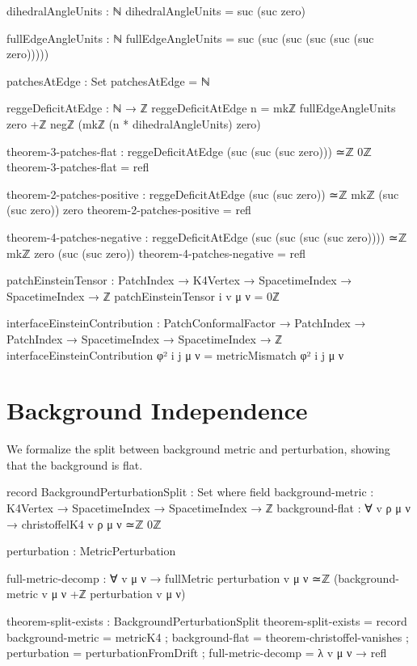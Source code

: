\documentclass[11pt,a4paper]{book}
\begin{document}
\begin{code}
dihedralAngleUnits : ℕ
dihedralAngleUnits = suc (suc zero)

fullEdgeAngleUnits : ℕ
fullEdgeAngleUnits = suc (suc (suc (suc (suc (suc zero)))))

patchesAtEdge : Set
patchesAtEdge = ℕ

reggeDeficitAtEdge : ℕ → ℤ
reggeDeficitAtEdge n = 
  mkℤ fullEdgeAngleUnits zero +ℤ 
  negℤ (mkℤ (n * dihedralAngleUnits) zero)

theorem-3-patches-flat : reggeDeficitAtEdge (suc (suc (suc zero))) ≃ℤ 0ℤ
theorem-3-patches-flat = refl

theorem-2-patches-positive : reggeDeficitAtEdge (suc (suc zero)) ≃ℤ mkℤ (suc (suc zero)) zero
theorem-2-patches-positive = refl

theorem-4-patches-negative : reggeDeficitAtEdge (suc (suc (suc (suc zero)))) ≃ℤ mkℤ zero (suc (suc zero))
theorem-4-patches-negative = refl

patchEinsteinTensor : PatchIndex → K4Vertex → SpacetimeIndex → SpacetimeIndex → ℤ
patchEinsteinTensor i v μ ν = 0ℤ

interfaceEinsteinContribution : PatchConformalFactor → PatchIndex → PatchIndex → 
                                 SpacetimeIndex → SpacetimeIndex → ℤ
interfaceEinsteinContribution φ² i j μ ν = 
  metricMismatch φ² i j μ ν
\end{code}

\section{Background Independence}

We formalize the split between background metric and perturbation, showing that the background is flat.

\begin{code}
record BackgroundPerturbationSplit : Set where
  field
    background-metric  : K4Vertex → SpacetimeIndex → SpacetimeIndex → ℤ
    background-flat    : ∀ v ρ μ ν → christoffelK4 v ρ μ ν ≃ℤ 0ℤ
    
    perturbation       : MetricPerturbation
    
    full-metric-decomp : ∀ v μ ν → 
      fullMetric perturbation v μ ν ≃ℤ (background-metric v μ ν +ℤ perturbation v μ ν)

theorem-split-exists : BackgroundPerturbationSplit
theorem-split-exists = record
  { background-metric  = metricK4
  ; background-flat    = theorem-christoffel-vanishes
  ; perturbation       = perturbationFromDrift
  ; full-metric-decomp = λ v μ ν → refl
  }
\end{code}
\end{document}
